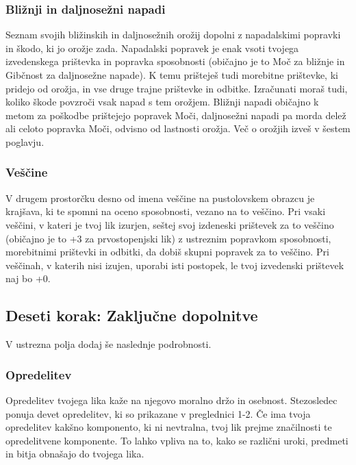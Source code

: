\subsubsection{Bližnji in daljnosežni napadi}
Seznam svojih bližinskih in daljnosežnih orožij dopolni z napadalskimi popravki in škodo, ki jo orožje zada. Napadalski popravek je enak vsoti tvojega izvedenskega prištevka in popravka sposobnosti (običajno je to Moč za bližnje in Gibčnost za daljnosežne napade). K temu prišteješ tudi morebitne prištevke, ki pridejo od orožja, in vse druge trajne prištevke in odbitke. Izračunati moraš tudi, koliko škode povzroči vsak napad s tem orožjem. Bližnji napadi običajno k metom za poškodbe prištejejo popravek Moči, daljnosežni napadi pa morda delež ali celoto popravka Moči, odvisno od lastnosti orožja. Več o orožjih izveš v šestem poglavju.

\subsubsection{Veščine}
V drugem prostorčku desno od imena veščine na pustolovskem obrazcu je krajšava, ki te spomni na oceno sposobnosti, vezano na to veščino. Pri vsaki veščini, v kateri je tvoj lik izurjen, seštej svoj izdeneski prištevek za to veščino (običajno je to +3 za prvostopenjski lik) z ustreznim popravkom sposobnosti, morebitnimi prištevki in odbitki, da dobiš skupni popravek za to veščino. Pri veščinah, v katerih nisi izujen, uporabi isti postopek, le tvoj izvedenski prištevek naj bo +0.

\subsection{Deseti korak: Zaključne dopolnitve}
V ustrezna polja dodaj še naslednje podrobnosti.

\subsubsection{Opredelitev}
Opredelitev tvojega lika kaže na njegovo moralno držo in osebnost. Stezosledec ponuja devet opredelitev, ki so prikazane v preglednici 1-2. Če ima tvoja opredelitev kakšno komponento, ki ni nevtralna, tvoj lik prejme značilnosti te opredelitvene komponente. To lahko vpliva na to, kako se različni uroki, predmeti in bitja obnašajo do tvojega lika.

